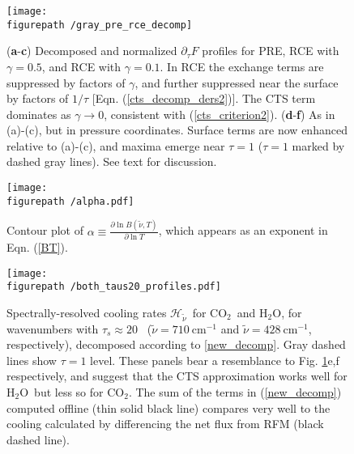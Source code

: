 \documentclass{ametsoc}
\newcommand{\eqnref}[1]{(\ref{#1})}
\newcommand{\cminverse}{\ensuremath{\mathrm{cm^{-1}}}}
\newcommand{\partialder}[2]{\ensuremath{\frac{\partial #1}{\partial #2}}}
\newcommand{\pptau}{\ensuremath{\partial_\tau}}
\newcommand{\cotwo}{\ensuremath{\mathrm{CO_2}}}
\newcommand{\htwo}{\ensuremath{\mathrm{H_2O}}}
\newcommand{\wv}{\ensuremath{\widetilde{\nu}}}
\newcommand{\ch}{\ensuremath{\mathcal{H}}}
\newcommand{\chk}{\ensuremath{\ch_\wv}}
\newcommand{\taus}{\ensuremath{\tau_s}}
\newcommand{\figurepath}{../plots/}
\begin{document}
\begin{figure}[h]
	\begin{center}
			\texttt{[image: \\figurepath /gray\_pre\_rce\_decomp]}
		\caption{(\textbf{a}-\textbf{c}) Decomposed and normalized $\pptau F$ profiles for PRE, RCE with $\gamma=0.5$, and RCE with $\gamma=0.1$. In RCE the exchange terms are suppressed by factors of $\gamma$, and further suppressed near the surface by factors of $1/\tau$ [Eqn. \eqnref{cts_decomp_ders2}]. The CTS term dominates as $\gamma\rightarrow 0$, consistent with \eqnref{cts_criterion2}. 
		(\textbf{d}-\textbf{f}) As in (a)-(c), but in pressure coordinates. Surface terms are now enhanced relative to (a)-(c), and maxima emerge near  $\tau= 1$ ($\tau=1$ marked by dashed gray lines). See text for discussion.
		\label{gray_rce}
		}
	\end{center}
\end{figure}

\begin{figure}[h]
	\begin{center}
			\texttt{[image: \\figurepath /alpha.pdf]}
		\caption{Contour plot of $\alpha \equiv \partialder{\ln B(\wv,T)}{\ln T}$, which appears as an exponent in Eqn.  \eqnref{BT}.  
		\label{alpha}
		}
	\end{center}
\end{figure}

\begin{figure}[h]
	\begin{center}
			\texttt{[image: \\figurepath /both\_taus20\_profiles.pdf]}
		\caption{Spectrally-resolved cooling rates \chk\ for \cotwo\  and \htwo, for  wavenumbers with $\taus\approx20$ \, ($\wv=710\ \cminverse$ and $\wv=428\ \cminverse$, respectively), decomposed according to  \eqref{new_decomp}. Gray dashed lines show $\tau=1$ level. These panels bear a resemblance to Fig. \ref{gray_rce}e,f respectively, and suggest that the  CTS approximation works well for \htwo\ but less so for \cotwo. The sum of the terms in \eqnref{new_decomp} computed offline (thin solid black line) compares very well to the cooling calculated by differencing the net flux  from RFM (black dashed line).
		\label{both_taus20_profiles}
		}
	\end{center}
\end{figure}
\end{document}
